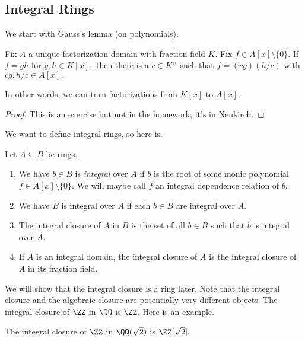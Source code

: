 \subsection{Integral Rings}
We start with Gauss's lemma (on polynomials).
\begin{lem}[Gauss] \label{lem:gauss}
    Fix $A$ a unique factorization domain with fraction field $K.$ Fix $f\in A[x]\setminus\{0\}.$ If $f=gh$ for $g,h\in K[x],$ then there is a $c\in K^\times$ such that $f=(cg)(h/c)$ with $cg,h/c\in A[x].$
\end{lem}
In other words, we can turn factorizations from $K[x]$ to $A[x].$
\begin{proof}
    This is an exercise but not in the homework; it's in Neukirch.
\end{proof}
We want to define integral rings, so here is.
\begin{defi}[Integral]
    Let $A\subseteq B$ be rings.
    \begin{enumerate}[label=(\alph*)]
        \item We have $b\in B$ is \textit{integral} over $A$ if $b$ is the root of some monic polynomial $f\in A[x]\setminus\{0\}.$ We will maybe call $f$ an integral dependence relation of $b.$
        \item We have $B$ is integral over $A$ if each $b\in B$ are integral over $A.$
        \item The integral closure of $A$ in $B$ is the set of all $b\in B$ such that $b$ is integral over $A.$
        \item If $A$ is an integral domain, the integral closure of $A$ is the integral closure of $A$ in its fraction field.
    \end{enumerate}
\end{defi}
We will show that the integral closure is a ring later. Note that the integral closure and the algebraic closure are potentially very different objects. The integral closure of $\ZZ$ in $\QQ$ is $\ZZ.$ Here is an example.
\begin{prop}
    The integral closure of $\ZZ$ in $\QQ(\sqrt2)$ is $\ZZ[\sqrt2].$
\end{prop}
